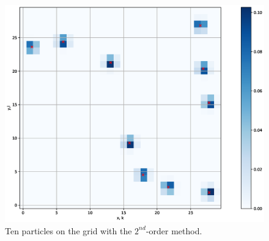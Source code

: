 \documentclass{scrartcl}
\begin{document}
\begin{figure}[h]
	\centering
	\includegraphics[width=0.9\linewidth]{Plots/2nd_order.eps}
	\caption{Ten particles on the grid with the \(2^{nd}\)-order method.}
	\label{fig:2ndorder}
\end{figure}
\end{document}
